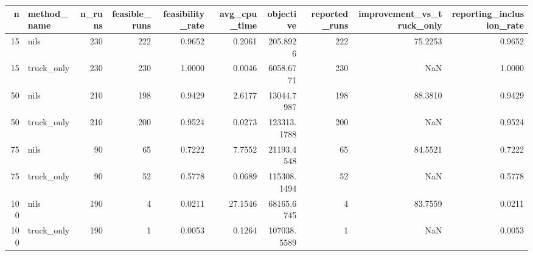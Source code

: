 \begin{tabular}{rlrrrrrrrr}
\toprule
n & method_name & n_runs & feasible_runs & feasibility_rate & avg_cpu_time & objective & reported_runs & improvement_vs_truck_only & reporting_inclusion_rate \\
\midrule
15 & nils & 230 & 222 & 0.9652 & 0.2061 & 205.8926 & 222 & 75.2253 & 0.9652 \\
15 & truck_only & 230 & 230 & 1.0000 & 0.0046 & 6058.6771 & 230 & NaN & 1.0000 \\
50 & nils & 210 & 198 & 0.9429 & 2.6177 & 13044.7987 & 198 & 88.3810 & 0.9429 \\
50 & truck_only & 210 & 200 & 0.9524 & 0.0273 & 123313.1788 & 200 & NaN & 0.9524 \\
75 & nils & 90 & 65 & 0.7222 & 7.7552 & 21193.4548 & 65 & 84.5521 & 0.7222 \\
75 & truck_only & 90 & 52 & 0.5778 & 0.0689 & 115308.1494 & 52 & NaN & 0.5778 \\
100 & nils & 190 & 4 & 0.0211 & 27.1546 & 68165.6745 & 4 & 83.7559 & 0.0211 \\
100 & truck_only & 190 & 1 & 0.0053 & 0.1264 & 107038.5589 & 1 & NaN & 0.0053 \\
\bottomrule
\end{tabular}
